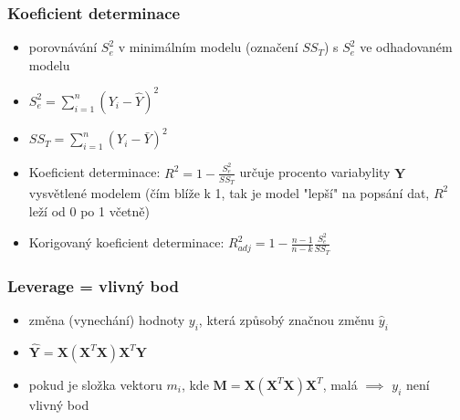 \subsubsection{Koeficient determinace}
\begin{itemize}
    \item porovnávání $S_{e}^{2}$ v minimálním modelu (označení $SS_T$) s $S_{e}^{2}$ ve odhadovaném modelu 
    \item $S_{e}^{2} = \sum_{i=1}^{n} \left( Y_i - \hat{Y} \right)^2$
    \item $SS_{T} = \sum_{i=1}^{n} \left( Y_i - \bar{Y} \right)^2$
    \item Koeficient determinace: $R^2 = 1 -\frac{S_{e}^{2}}{SS_{T}}$ určuje procento variabylity $\mathbf{Y}$ vysvětlené modelem (čím blíže k 1, tak je model "lepší" na popsání dat, $R^2$ leží od 0 po 1 včetně)
    \item Korigovaný koeficient determinace:  $R_{adj}^{2} = 1 -\frac{n-1}{n-k} \frac{S_{e}^{2}}{SS_{T}}$
\end{itemize}

\subsubsection{Leverage = vlivný bod}
\begin{itemize}
    \item změna (vynechání) hodnoty $y_i$, která způsobý značnou změnu $\hat{y}_i$
    \item $\hat{\mathbf{Y}} = \mathbf{X} \left( \mathbf{X}^T \mathbf{X} \right) \mathbf{X} ^T \mathbf{Y}$
    \item pokud je složka vektoru $m_i$, kde $\mathbf{M} = \mathbf{X} \left( \mathbf{X}^T \mathbf{X} \right) \mathbf{X} ^T$, malá $\implies$ $y_i$ není vlivný bod 
\end{itemize}

